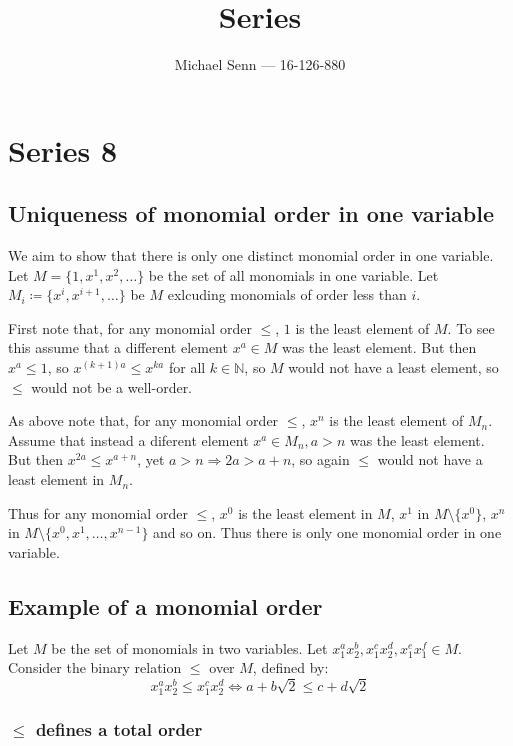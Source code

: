 \documentclass[a4paper]{scrreprt}
\title{Series \series}
\author{Michael Senn \maillink{michael.senn@students.unibe.ch} --- 16-126-880}
\date{\printdate}
\newcommand{\series}{8}
\begin{document}
\maketitle


\setcounter{chapter}{\numexpr \series - 1 \relax}

\chapter{Series \series}

\section{Uniqueness of monomial order in one variable}

We aim to show that there is only one distinct monomial order in one
variable. Let $M = \{1, x^1, x^2, \ldots\}$ be the set of all monomials in one
variable. Let $M_i \coloneqq \{x^i, x^{i+1}, \ldots \}$ be $M$ exlcuding
monomials of order less than $i$.

First note that, for any monomial order $\leq$, $1$ is the least element of
$M$. To see this assume that a different element $x^a \in M$ was the least
element. But then $x^a \leq 1$, so $x^{(k+1)a} \leq x^{ka}$ for all $k \in
\mathbb{N}$, so $M$ would not have a least element, so $\leq$ would not be a
well-order.

As above note that, for any monomial order $\leq$, $x^n$ is the least element
of $M_n$. Assume that instead a diferent element $x^a \in M_n, a > n$ was the
least element. But then $x^{2a} \leq x^{a + n}$, yet $a > n \Rightarrow 2a >
a+n$, so again $\leq$ would not have a least element in $M_n$.

Thus for any monomial order $\leq$, $x^0$ is the least element in $M$, $x^1$
in $M \setminus\{x^0\}$, $x^n$ in $M \setminus \{x^0, x^1, \ldots, x^{n-1}\}$ and
so on. Thus there is only one monomial order in one variable.

\section{Example of a monomial order}
\label{sec:monomial_order}

Let $M$ be the set of monomials in two variables. Let $x_1^a x_2^b, x_1^c
x_2^d, x_1^e x_1^f \in M$. Consider the binary relation $\leq$ over $M$,
defined by:
\[
		x_1^a x_2^b \leq x_1^c x_2^d \Leftrightarrow a + b \sqrt{2} \leq c + d \sqrt{2}
\]

\subsection{$\leq$ defines a total order}
\end{document}
